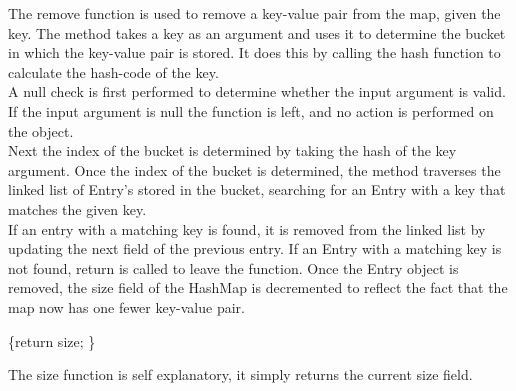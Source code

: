 \documentclass[a4paper]{article}
\begin{document}
The remove function is used to remove a key-value pair from the map, given the key.
The method takes a key as an argument and uses it to determine the bucket in which the key-value pair is stored.
It does this by calling the hash function to calculate the hash-code of the key. \\

A null check is first performed to determine whether the input argument is valid.
If the input argument is null the function is left, and no action is performed on the object. \\

Next the index of the bucket is determined by taking the hash of the key argument.
Once the index of the bucket is determined, the method traverses the linked list of Entry's stored in the bucket,
searching for an Entry with a key that matches the given key. \\

If an entry with a matching key is found, it is removed from the linked list by updating the next field of the previous entry.
If an Entry with a matching key is not found, return is called to leave the function.
Once the Entry object is removed, the size field of the HashMap is decremented to reflect the fact that the map now has one fewer key-value pair.

\pagebreak







\vspace{4mm}
\makeatletter
\renewcommand{\ALG@name}{Hashmap Method}
\makeatother

\begin{algorithm}
\caption{}\label{euclid}
\begin{algorithmic}[1]

\algrenewcommand{}
 {\{return size; \}}
\EndProcedure
\end{algorithmic}
\end{algorithm}

The size function is self explanatory, it simply returns the current size field.


\vspace{8mm}


\end{document}
